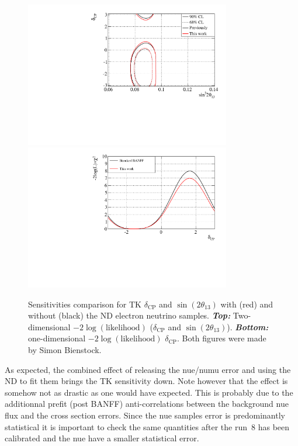 \begin{figure}[ht]
  \begin{center}
    \includegraphics[width=0.8\textwidth]{images/BANFF/2D.pdf}
    \includegraphics[width=0.8\textwidth]{images/BANFF/dcp1D.pdf}
    \caption[Sensitivities comparison for T2K $\delta_\text{CP}$ and
    $\sin(2\theta_{13})$ with and without the ND280 electron neutrino
    samples]{Sensitivities comparison for \Gls{TK} $\delta_\text{CP}$
      and $\sin(2\theta_{13})$ with (red) and without (black) the
      \Gls{ND} electron neutrino samples.  \textbf{\textit{Top:}}
      Two-dimensional $-2\log(\text{likelihood})$ ($\delta_\text{CP}$
      and $\sin(2\theta_{13})$). \textbf{\textit{Bottom:}}
      one-dimensional $-2\log(\text{likelihood})$
      $\delta_\text{CP}$. Both figures were made by Simon Bienstock.}
    \label{fig:asimovdeltacp}
  \end{center}
\end{figure}

As expected, the combined effect of releasing the \Gls{nue}/\Gls{numu}
error and using the \Gls{ND} to fit them brings the \Gls{TK}
sensitivity down. Note however that the effect is somehow not as
drastic as one would have expected. This is probably due to the
additionnal prefit (post \Gls{BANFF}) anti-correlations between the
background \Gls{nue} flux and the cross section errors. Since the
\Gls{nue} samples error is predominantly statistical it is important
to check the same quantities after the run~8 has been calibrated and
the \Gls{nue} have a smaller statistical error.

